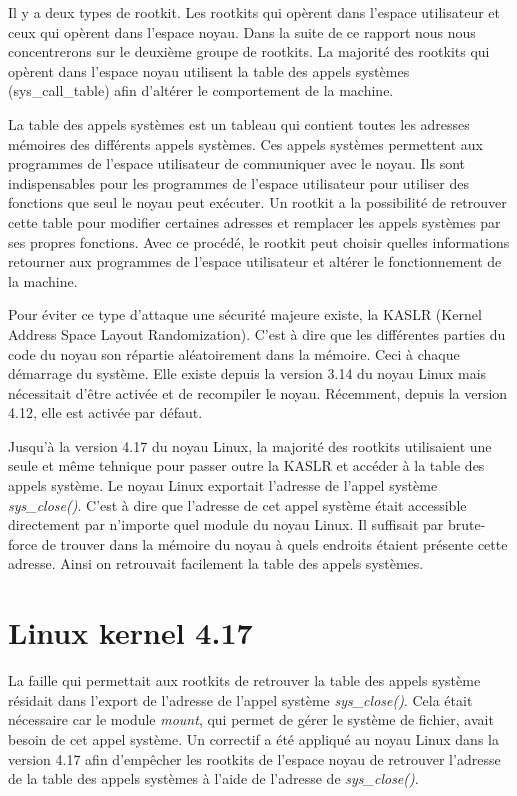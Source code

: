 \documentclass[journal, a4paper]{IEEEtran}
\begin{document}
Il y a deux types de rootkit. Les rootkits qui opèrent dans l'espace utilisateur et ceux qui opèrent dans l'espace noyau. Dans la suite de ce rapport nous nous concentrerons sur le deuxième groupe de rootkits. La majorité des rootkits qui opèrent dans l'espace noyau utilisent la table des appels systèmes (sys\_call\_table) afin d'altérer le comportement de la machine.

La table des appels systèmes est un tableau qui contient toutes les adresses mémoires des différents appels systèmes. Ces appels systèmes permettent aux programmes de l'espace utilisateur de communiquer avec le noyau. Ils sont indispensables pour les programmes de l'espace utilisateur pour utiliser des fonctions que seul le noyau peut exécuter. Un rootkit a la possibilité de retrouver cette table pour modifier certaines adresses et remplacer les appels systèmes par ses propres fonctions. Avec ce procédé, le rootkit peut choisir quelles informations retourner aux programmes de l'espace utilisateur et altérer le fonctionnement de la machine.

Pour éviter ce type d'attaque une sécurité majeure existe, la  KASLR (Kernel Address Space Layout Randomization). C'est à dire que les différentes parties du code du noyau son répartie aléatoirement dans la mémoire. Ceci à chaque démarrage du système. Elle existe depuis la version 3.14 du noyau Linux mais nécessitait d'être activée et de recompiler le noyau. Récemment, depuis la version 4.12, elle est activée par défaut.

Jusqu'à la version 4.17 du noyau Linux, la majorité des rootkits utilisaient une seule et même tehnique pour passer outre la KASLR et accéder à la table des appels système. Le noyau Linux exportait l'adresse de l'appel système \textit{sys\_close()}. C'est à dire que l'adresse de cet appel système était accessible directement par n'importe quel module du noyau Linux. Il suffisait par brute-force de trouver dans la mémoire du noyau à quels endroits étaient présente cette adresse. Ainsi on retrouvait facilement la table des appels systèmes.

\section{Linux kernel 4.17}

La faille qui permettait aux rootkits de retrouver la table des appels système résidait dans l'export de l'adresse de l'appel système \textit{sys\_close()}. Cela était nécessaire car le module \textit{mount}, qui permet de gérer le système de fichier, avait besoin de cet appel système. Un correctif a été appliqué au noyau Linux dans la version 4.17 afin d'empêcher les rootkits de l'espace noyau de retrouver l'adresse de la table des appels systèmes à l'aide de l'adresse de \textit{sys\_close()}. 
\end{document}
